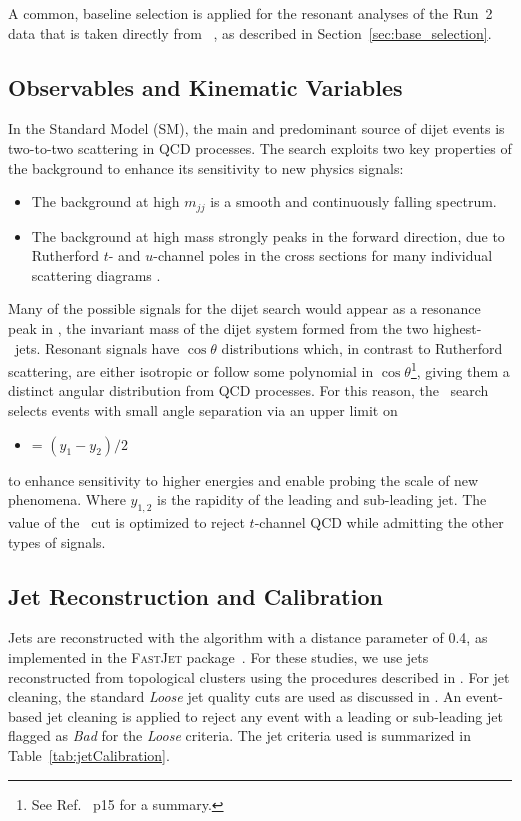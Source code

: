 A common, baseline selection is applied for the resonant  analyses of
the Run~2 data that is taken directly from ~\cite{Nishu:2646455}, as
described in Section~\ref{sec:base_selection}. 


\subsection{Observables and Kinematic Variables}
\label{sec:observables}
In the Standard Model (SM), the main and predominant source of dijet
events is two-to-two scattering in QCD processes. The search exploits
two key properties of the background to enhance its sensitivity to new
physics signals:

\begin{itemize}
	\item The background at high $m_{jj}$ is a smooth and continuously falling spectrum.
	\item The background at high mass strongly peaks in the forward
direction, due to Rutherford $t$- and $u$-channel poles in the cross sections
for many individual scattering diagrams \cite{Harris:2011bh}.
\end{itemize}

Many of the possible signals for the dijet search would appear as a
resonance peak in \mjj, the invariant mass of the dijet system formed
from the two highest-\pT\ jets. Resonant signals have $\cos{\theta}$
distributions which, in contrast to Rutherford scattering, are either
isotropic or follow some polynomial in $\cos{\theta}$\footnote{See
Ref.~\cite{Harris:2011bh} p15 for a summary.}, giving them a distinct
angular distribution from QCD processes. For this reason, the \mjj\
search selects events with small angle separation via an upper limit on
\begin{itemize}
	\item \ystar = $(y_1-y_2)/2$
\end{itemize}
to enhance sensitivity to higher energies and enable probing the scale
of new phenomena. Where $y_{1,2}$ is the rapidity of the leading and
sub-leading jet. The value of the \ystar\ cut is optimized to reject
$t$-channel QCD while admitting the other types of signals.

\subsection{Jet Reconstruction and Calibration}
Jets are reconstructed with the \akt algorithm \cite{Cacciari:2008gp}
with a distance parameter of 0.4, as implemented in the \textsc{FastJet}
package~\cite{Cacciari:2011ma}. For these studies, we use jets
reconstructed from topological clusters using the procedures described
in \cite{ATLAS-CONF-2015-002}. For jet cleaning, the standard
\textit{Loose} jet quality cuts are used as discussed in
\cite{ATLAS-CONF-2015-029}. An event-based jet cleaning is applied to
reject any event with a leading or sub-leading jet flagged as
\textit{Bad} for the \textit{Loose} criteria.  The jet criteria used is
summarized in Table~\ref{tab:jetCalibration}.

